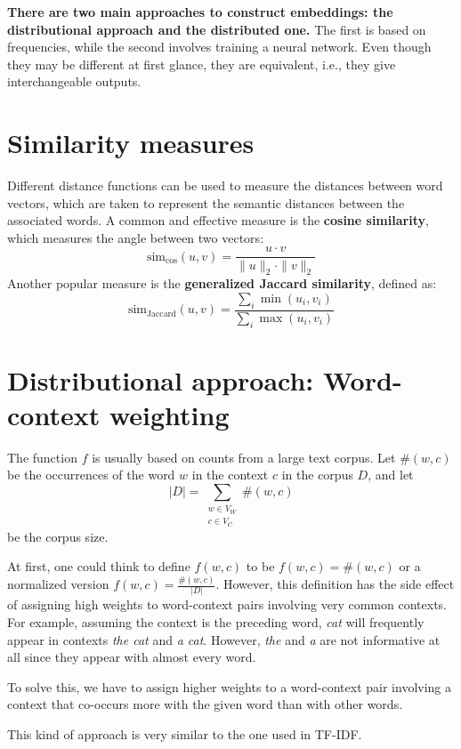 \textbf{There are two main approaches to construct embeddings: the distributional approach and the distributed one.} 
The first is based on frequencies, while the second involves training a neural network. Even though they may be different at first glance, they are equivalent, i.e., they give interchangeable outputs.

\section{Similarity measures}
Different distance functions can be used to measure the distances between word vectors, which are taken to represent the semantic distances between the associated words. A common and effective measure is the \textbf{cosine similarity}, which measures the angle between two vectors:
\[
\text{sim}_{\cos}(u,v)=\frac{u\cdot v}{\| u \|_{2}\cdot \| v \|_{2}}
\]
Another popular measure is the \textbf{generalized Jaccard similarity}, defined as:
\[
\text{sim}_{\text{Jaccard}}(u,v)=\frac{\sum_{i}\min(u_{i}, v_{i})}{\sum_{i}\max(u_{i}, v_{i})}
\]

\section{Distributional approach: Word-context weighting}
The function $f$ is usually based on counts from a large text corpus. Let $\#(w,c)$ be the occurrences of the word $w$ in the context $c$ in the corpus $D$, and let
\[
|D|=\sum_{\substack{w\in V_{W}\\c\in V_{C}}}\#(w,c)
\]
be the corpus size.

At first, one could think to define $f(w,c)$ to be $f(w,c)=\#(w,c)$ or a normalized version $f(w,c)=\frac{\#(w,c)}{|D|}$. However, this definition has the side effect of assigning high weights to word-context pairs involving very common contexts. For example, assuming the context is the preceding word, \textit{cat} will frequently appear in contexts \textit{the cat} and \textit{a cat}. However, \textit{the} and \textit{a} are not informative at all since they appear with almost every word.

To solve this, we have to assign higher weights to a word-context pair involving a context that co-occurs more with the given word than with other words.

\begin{note}{}
This kind of approach is very similar to the one used in TF-IDF.
\end{note}

